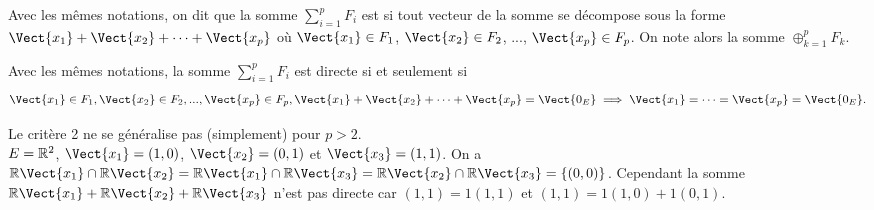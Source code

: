 \documentclass{book}
\begin{document}
\begin{Definition}
Avec les mêmes notations, on dit que la somme $\sum_{i=1}^p F_i$ est  si tout vecteur de la somme se décompose  sous la forme $\Vect{x_1} +\Vect{x_2}+ \dots + \Vect{x_p}$ où $\Vect{x_1}\in F_1$, $\Vect{x_2}\in F_2$, ..., $\Vect{x_p}\in F_p$.
On note alors la somme $\oplus_{k=1}^p F_k$.
\end{Definition}
\begin{Proposition}[Critère 1]
Avec les mêmes notations, la somme $\sum_{i=1}^p F_i$ est directe si et seulement si
$$\Vect{x_1}\in F_1, \Vect{x_2}\in F_2, ..., \Vect{x_p}\in F_p,
 \Vect{x_1} +\Vect{x_2}+ \dots + \Vect{x_p} = \Vect{0_E} \implies \Vect{x_1} =\dots=\Vect{x_p}= \Vect{0_E}.$$
\end{Proposition}  
\begin{Remarque}
Le critère 2 ne se généralise pas (simplement) pour $p > 2$.\\
$E = \mathbb{R} ^2$, $\Vect{x_1} = (1,0)$, $\Vect{x_2} = (0,1)$ et $\Vect{x_3} = (1,1)$.
On a $\R \Vect{x_1} \cap \R \Vect{x_2} = \R \Vect{x_1} \cap \R \Vect{x_3} = \R \Vect{x_2} \cap \R \Vect{x_3} = \{(0,0)\}$. Cependant la somme $\R \Vect{x_1} + \R \Vect{x_2} + \R \Vect{x_3}$ n'est pas directe car $(1,1)=1(1,1)$ et $(1,1)=1(1,0)+1(0,1).$ 
\end{Remarque}
\end{document}
